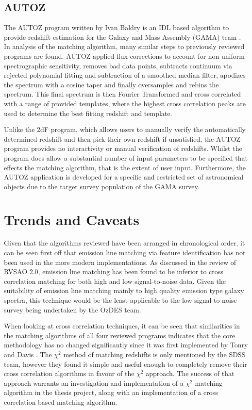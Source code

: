 \documentclass[titlesmallcaps, examinerscopy, copyrightpage]{uqthesis}
\begin{document}
\subsection{\textsc{AUTOZ}}

The \textsc{AUTOZ} program written by Ivan Baldry is an IDL based algorithm to provide redshift estimation for the Galaxy and Mass Assembly (GAMA) team \cite{baldry2014galaxy}. In analysis of the matching algorithm, many similar steps to previously reviewed programs are found. \textsc{AUTOZ} applied flux corrections to account for non-uniform spectrographic sensitivity, removes bad data points, subtracts continuum via rejected polynomial fitting and subtraction of a smoothed median filter, apodizes the spectrum with a cosine taper and finally oversamples and rebins the spectrum. This final spectrum is then Fourier Transformed and cross correlated with a range of provided templates, where the highest cross correlation peaks are used to determine the best fitting redshift and template.

Unlike the 2dF program, which allows users to manually verify the automatically determined redshift and then pick their own redshift if unsatisfied, the \textsc{AUTOZ} program provides no interactivity or manual verification of redshifts. Whilst the program does allow a substantial number of input parameters to be specified that effects the matching algorithm, that is the extent of user input. Furthermore, the \textsc{AUTOZ} application is developed for a specific and restricted set of astronomical objects due to the target survey population of the GAMA survey.

\section{Trends and Caveats}

Given that the algorithms reviewed have been arranged in chronological order, it can be seen first off that emission line matching via feature identification has not been used in the more modern implementations. As discussed in the review of RVSAO 2.0, emission line matching has been found to be inferior to cross correlation matching for both high and low signal-to-noise data. Given the suitability of emission line matching mainly to high quality emission type galaxy spectra, this technique would be the least applicable to the low signal-to-noise survey being undertaken by the OzDES team.

When looking at cross correlation techniques, it can be seen that similarities in the matching algorithms of all four reviewed programs indicates that the core methodology has no changed significantly since it was first implemented by Tonry and Davis \cite{tonry1979survey}. The $\chi^2$ method of matching redshifts is only mentioned by the SDSS team, however they found it simple and useful enough to completely remove their cross correlation algorithms in favour of the $\chi^2$ approach. The success of that approach warrants an investigation and implementation of a $\chi^2$ matching algorithm in the thesis project, along with an implementation of a cross correlation based matching algorithm.
\end{document}
